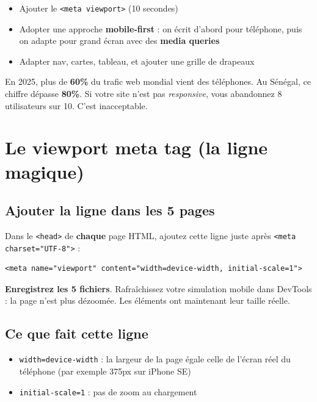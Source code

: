 \documentclass[11pt,a4paper]{article}
\newcommand{\cmark}{\ding{51}}
\begin{document}
\begin{itemize}[leftmargin=*,nosep]
    \item Ajouter le \texttt{<meta viewport>} (10 secondes)
    \item Adopter une approche \textbf{mobile-first} : on écrit d'abord pour téléphone, puis on adapte pour grand écran avec des \textbf{media queries}
    \item Adapter nav, cartes, tableau, et ajouter une grille de drapeaux
\end{itemize}

\begin{retenirbox}
En 2025, plus de \textbf{60\%} du trafic web mondial vient des téléphones.
Au Sénégal, ce chiffre dépasse \textbf{80\%}. Si votre site n'est pas
\emph{responsive}, vous abandonnez 8 utilisateurs sur 10. C'est
inacceptable.
\end{retenirbox}

\newpage

\section{Le viewport meta tag (la ligne magique)}

\subsection{Ajouter la ligne dans les 5 pages}

Dans le \texttt{<head>} de \textbf{chaque} page HTML, ajoutez cette ligne
juste après \texttt{<meta charset="UTF-8">} :

\begin{lstlisting}[language=HTML5]
<meta name="viewport" content="width=device-width, initial-scale=1">
\end{lstlisting}

\textbf{Enregistrez les 5 fichiers}. Rafraîchissez votre simulation
mobile dans DevTools : la page n'est plus dézoomée. Les éléments ont
maintenant leur taille \og{}réelle\fg{}. \cmark

\subsection{Ce que fait cette ligne}

\begin{itemize}[leftmargin=*,nosep]
    \item \texttt{width=device-width} : la largeur de la page égale celle de l'écran réel du téléphone (par exemple 375px sur iPhone SE)
    \item \texttt{initial-scale=1} : pas de zoom au chargement
\end{itemize}
\end{document}
